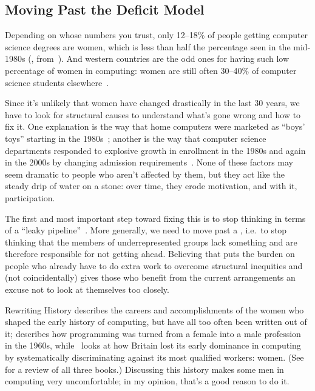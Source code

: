 \subsection*{Moving Past the Deficit Model}

Depending on whose numbers you trust,
only 12--18\% of people getting computer science degrees are women,
which is less than half the percentage seen in the mid-1980s
(, from~\cite{Robe2017}).
And western countries are the odd ones for having such low percentage of women in computing:
women are still often 30--40\% of computer science students elsewhere~\cite{Galp2002,Varm2015}.


Since it's unlikely that women have changed drastically in the last 30 years,
we have to look for structural causes to understand what's gone wrong and how to fix it.
One explanation is the way that home computers were marketed as ``boys' toys'' starting in the 1980s~\cite{Marg2003};
another is the way that computer science departments responded to explosive growth in enrollment
in the 1980s and again in the 2000s
by changing admission requirements~\cite{Robe2017}.
None of these factors may seem dramatic to people who aren't affected by them,
but they act like the steady drip of water on a stone:
over time, they erode motivation, and with it, participation.

The first and most important step toward fixing this is
to stop thinking in terms of a ``leaky pipeline''~\cite{Mill2015}.
More generally,
we need to move past a ,
i.e.\ to stop thinking that the members of underrepresented groups lack something
and are therefore responsible for not getting ahead.
Believing that puts the burden on people who already have to do extra work to overcome structural inequities
and (not coincidentally) gives those who benefit from the current arrangements
an excuse not to look at themselves too closely.

\begin{aside}{Rewriting History}
  \cite{Abba2012} describes the careers and accomplishments of
  the women who shaped the early history of computing,
  but have all too often been written out of it;
  \cite{Ensm2003,Ensm2012} describes how programming was turned from a female into a male profession in the 1960s,
  while~\cite{Hick2018} looks at how Britain lost its early dominance in computing
  by systematically discriminating against its most qualified workers:
  women.
  (See \cite{Milt2018} for a review of all three books.)
  Discussing this history makes some men in computing very uncomfortable;
  in my opinion,
  that's a good reason to do it.
\end{aside}

